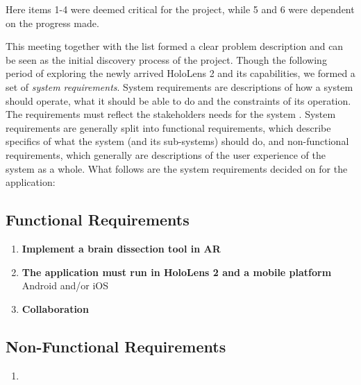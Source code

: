 
Here items 1-4 were deemed critical for the project, while 5 and 6 were dependent on the progress made.

This meeting together with the list formed a clear problem description and can be seen as the initial discovery process of the project. Though the following period of exploring the newly arrived HoloLens 2 and its capabilities, we formed a set of \textit{system requirements}. 
System requirements are descriptions of how a system should operate, what it should be able to do and the constraints of its operation. The requirements must reflect the stakeholders needs for the system \citep{PUboka}. System requirements are generally split into functional requirements, which describe specifics of what the system (and its sub-systems) should do, and non-functional requirements, which generally are descriptions of the user experience of the system as a whole. 
What follows are the system requirements decided on for the application: 

\subsection*{Functional Requirements}
\begin{enumerate}
    \item {
        \textbf{Implement a brain dissection tool in AR}\\
         
    }
    \item {
        \textbf{The application must run in HoloLens 2 and a mobile platform}\\
         Android and/or iOS
    }

    \item {
        \textbf{Collaboration}\\
         
    }

\end{enumerate}

\subsection*{Non-Functional Requirements}

\begin{enumerate}
    \item 
\end{enumerate}











